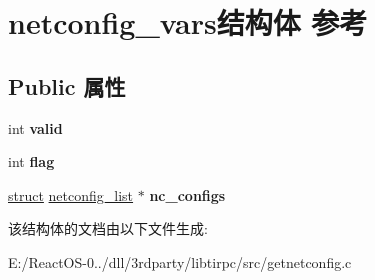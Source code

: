\hypertarget{structnetconfig__vars}{}\section{netconfig\+\_\+vars结构体 参考}
\label{structnetconfig__vars}
\subsection*{Public 属性}
\begin{DoxyCompactItemize}
\item 
\mbox{\label{structnetconfig__vars_a242c8eb7e1a58483098c35f1b5fef90b}} 
int {\bfseries valid}
\item 
\mbox{\label{structnetconfig__vars_adf773aed634c28c1c6451f2fa54d2297}} 
int {\bfseries flag}
\item 
\mbox{\label{structnetconfig__vars_aac275ebd855bf328d03a14688eec6def}} 
\hyperlink{interfacestruct}{struct} \hyperlink{structnetconfig__list}{netconfig\+\_\+list} $\ast$ {\bfseries nc\+\_\+configs}
\end{DoxyCompactItemize}


该结构体的文档由以下文件生成\+:\begin{DoxyCompactItemize}
\item 
E\+:/\+React\+O\+S-\/0../dll/3rdparty/libtirpc/src/getnetconfig.\+c\end{DoxyCompactItemize}
